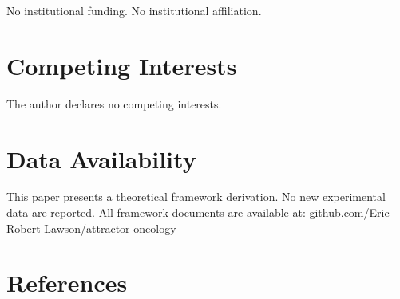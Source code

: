 \documentclass[12pt,a4paper]{article}
\begin{document}
No institutional funding. No institutional affiliation.

\section*{Competing Interests}

The author declares no competing interests.

\section*{Data Availability}

This paper presents a theoretical framework derivation. No new experimental
data are reported. All framework documents are available at:
\href{https://github.com/Eric-Robert-Lawson/attractor-oncology}{github.com/Eric-Robert-Lawson/attractor-oncology}

\section*{References}
\end{document}
